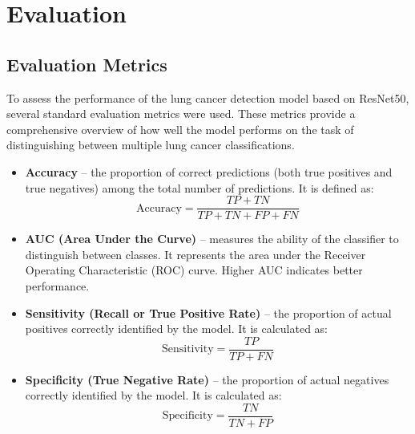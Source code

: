 
\section{Evaluation}


\subsection{Evaluation Metrics}

To assess the performance of the lung cancer detection model based on ResNet50, several standard 
evaluation metrics were used. These metrics provide a comprehensive overview of how well the model 
performs on the task of distinguishing between multiple lung cancer classifications.

\begin{itemize}
    \item \textbf{Accuracy} – the proportion of correct predictions (both true positives and true 
    negatives) among the total number of predictions. It is defined as:
    \[
    \text{Accuracy} = \frac{TP + TN}{TP + TN + FP + FN}
    \]

    \item \textbf{AUC (Area Under the Curve)} – measures the ability of the classifier to 
    distinguish between classes. It represents the area under the Receiver Operating Characteristic 
    (ROC) curve. Higher AUC indicates better performance.

    \item \textbf{Sensitivity (Recall or True Positive Rate)} – the proportion of actual positives 
    correctly identified by the model. It is calculated as:
    \[
    \text{Sensitivity} = \frac{TP}{TP + FN}
    \]

    \item \textbf{Specificity (True Negative Rate)} – the proportion of actual negatives correctly 
    identified by the model. It is calculated as:
    \[
    \text{Specificity} = \frac{TN}{TN + FP}
    \]
\end{itemize}

